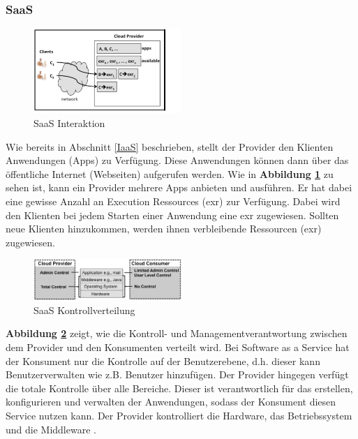 \subsubsection{SaaS}\label{SaaS Architektur}
\begin{figure}[h]
    \centering
	\includegraphics[width=0.5\textwidth]{Images/SaaSInteraction}
	\caption{SaaS Interaktion \cite{Badger}}
	\label{SaaSInteraction}
\end{figure}
Wie bereits in Abschnitt \ref{IaaS} beschrieben, stellt der Provider den Klienten Anwendungen (\glqq Apps\grqq{}{}) zu Verfügung.
Diese Anwendungen können dann über das öffentliche Internet (Webseiten) aufgerufen werden.
Wie in \textbf{Abbildung \ref{SaaSInteraction}} zu sehen ist, kann ein Provider mehrere Apps anbieten und ausführen.
Er hat dabei eine gewisse Anzahl an \glqq Execution Ressources\grqq{}{} (exr) zur Verfügung. 
Dabei wird den Klienten bei jedem Starten einer Anwendung eine exr zugewiesen. Sollten neue Klienten hinzukommen, werden ihnen verbleibende Ressourcen (exr) zugewiesen. 

\begin{figure}[h]
    \centering
	\includegraphics[width=0.5\textwidth]{Images/SaaSControl}
	\caption{SaaS Kontrollverteilung \cite{Badger}}
	\label{SaaSControl}
\end{figure}
\textbf{Abbildung \ref{SaaSControl}} zeigt, wie die Kontroll- und Managementverantwortung zwischen dem Provider und den Konsumenten verteilt wird.
Bei Software as a Service hat der Konsument nur die Kontrolle auf der Benutzerebene, d.h. dieser kann Benutzerverwalten wie z.B. Benutzer hinzufügen.
Der Provider hingegen verfügt die totale Kontrolle über alle Bereiche. Dieser ist verantwortlich für das erstellen, konfigurieren und verwalten der Anwendungen, 
sodass der Konsument diesen Service nutzen kann.
Der Provider kontrolliert die Hardware, das Betriebssystem und die Middleware \cite{Badger}.

